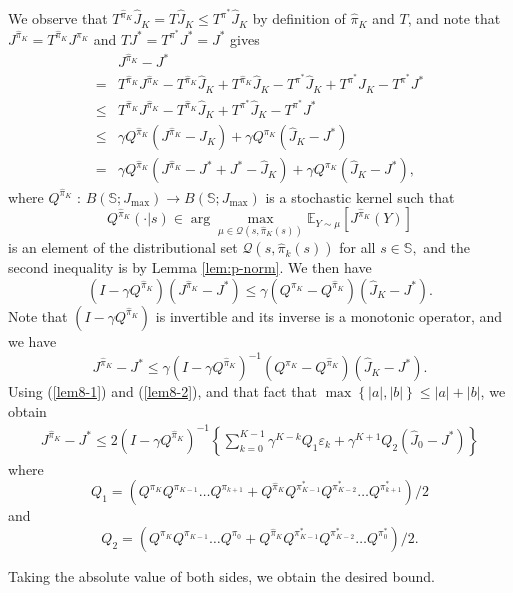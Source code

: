 \documentclass[12pt,technote,onecolumn]{IEEEtran}
\begin{document}
\begin{IEEEproof}
	We observe that $T^{\widehat{\pi}_{K}}\widehat{J}_{K}=T\widehat{J}_{K}\leq T^{\pi^{*}}\widehat{J}_{K}$
	by definition of $\hat{\pi}_{K}$ and $T$, and note that $J^{\widehat{\pi}_{K}}=T^{\widehat{\pi}_{K}}J^{\pi_{K}}$
	and $TJ^{*}=T^{\pi^{*}}J^{*}=J^{*}$ gives
	\begin{align*}
	&J^{\widehat{\pi}_{K}}-J^{*}\\
	= & T^{\widehat{\pi}_{K}}J^{\widehat{\pi}_{K}}-T^{\widehat{\pi}_{K}}\widehat{J}_{K}+T^{\widehat{\pi}_{K}}\widehat{J}_{K}-T^{\pi^{*}}\widehat{J}_{K}+T^{\pi^{*}}\widehat{J}_{K}-T^{\pi^{*}}J^{*}\\
	\leq & T^{\widehat{\pi}_{K}}J^{\widehat{\pi}_{K}}-T^{\widehat{\pi}_{K}}\widehat{J}_{K}+T^{\pi^{*}}\widehat{J}_{K}-T^{\pi^{*}}J^{*}\\
	\leq & \gamma Q^{\hat{\pi}_{K}}(J^{\widehat{\pi}_{K}}-\widehat{J}_{K})+\gamma Q^{\pi_{K}}(\widehat{J}_{K}-J^{*})\\
	= & \gamma Q^{\hat{\pi}_{K}}(J^{\widehat{\pi}_{K}}-J^{*}+J^{*}-\widehat{J}_{K})+\gamma Q^{\pi_{K}}(\widehat{J}_{K}-J^{*}),
	\end{align*}
	where $Q^{\hat{\pi}_{K}}\mbox{ : }B\left(\mathbb{S};J_{\max}\right) \rightarrow B\left(\mathbb{S};J_{\max}\right)$
	is a stochastic kernel such that 
	$$Q^{\hat{\pi}_{K}}(\cdot| s)\in\arg\max_{\mu\in\mathcal{Q}(s,\hat{\pi}_{K}(s))}\mathbb{E}_{Y\sim\mu}[J^{\widehat{\pi}_{K}}(Y)]$$
	is an element of the distributional set $\mathcal{Q}\left(s,\hat{\pi}_{k}\left(s\right)\right)$
	for all $s\in\mathbb{S},$ and the second inequality is by Lemma \ref{lem:p-norm}.
	We then have
	\[
	(I-\gamma Q^{\hat{\pi}_{K}})(J^{\widehat{\pi}_{K}}-J^{*})\leq\gamma(Q^{\pi_{K}}-Q^{\hat{\pi}_{K}})(\widehat{J}_{K}-J^{*}).
	\]
	Note that $(I-\gamma Q^{\hat{\pi}_{K}})$ is invertible
	and its inverse is a monotonic operator, and we have 
	\[
	J^{\widehat{\pi}_{K}}-J^{*}\leq\gamma(I-\gamma Q^{\hat{\pi}_{K}})^{-1}(Q^{\pi_{K}}-Q^{\hat{\pi}_{K}})(\widehat{J}_{K}-J^{*}).
	\]
	Using (\ref{lem8-1}) and (\ref{lem8-2}), and that fact that $\max\left\{ |a|,|b|\right\} \leq|a|+|b|$,
	we obtain
	\begin{equation*}		
	\begin{aligned}
	J^{\widehat{\pi}_{K}}-J^{*}\leq2(I-\gamma Q^{\hat{\pi}_{K}})^{-1}
	\left\{ \sum_{k=0}^{K-1}\gamma^{K-k}Q_{1}\varepsilon_{k}+\gamma^{K+1}Q_{2}\left(\widehat{J}_{0}-J^{*}\right)\right\} 
	\end{aligned}
	\end{equation*}
	where 
	$$Q_{1}=(Q^{\pi_{K}}Q^{\pi_{K-1}}\dots Q^{\pi_{k+1}}
	+Q^{\hat{\pi}_{K}}Q^{\pi_{K-1}^{*}}Q^{\pi_{K-2}^{*}}\dots Q^{\pi_{k+1}^{*}})/2$$ 
	and
	$$Q_{2}=(Q^{\pi_{K}}Q^{\pi_{K-1}}\dots Q^{\pi_{0}}
	+Q^{\hat{\pi}_{K}}Q^{\pi_{K-1}^{*}}Q^{\pi_{K-2}^{*}}\dots Q^{\pi_{0}^{*}})/2.$$
	
	Taking the absolute value of both sides, we obtain the desired bound. 
\end{IEEEproof}
\end{document}
